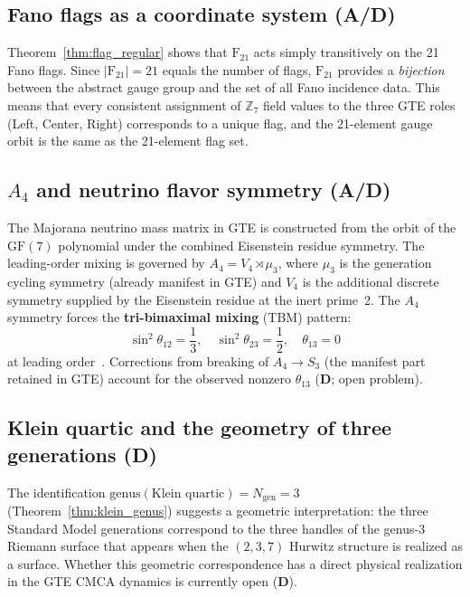 \documentclass[11pt]{article}
\theoremstyle{remark}
\newcommand{\GF}[1]{\ensuremath{\mathrm{GF}(#1)}}
\newcommand{\Ngen}{\ensuremath{N_{\mathrm{gen}}}}
\newcommand{\FineSeven}{\ensuremath{\mathrm{F}_{21}}}
\newcommand{\AltFour}{\ensuremath{A_4}}
\newcommand{\KleinFour}{\ensuremath{V_4}}
\newcommand{\CatAD}{\textbf{A/D}}
\newcommand{\CatD}{\textbf{D}}
\begin{document}
\subsection{Fano flags as a coordinate system (\CatAD)}

Theorem~\ref{thm:flag_regular} shows that $\FineSeven$ acts simply transitively
on the 21 Fano flags.
Since $|\FineSeven| = 21$ equals the number of flags, $\FineSeven$ provides a
\emph{bijection} between the abstract gauge group and the set of all Fano
incidence data.
This means that every consistent assignment of $\mathbb{Z}_7$ field values to
the three GTE roles (Left, Center, Right) corresponds to a unique flag, and the
21-element gauge orbit is the same as the 21-element flag set.

\subsection{\texorpdfstring{$\AltFour$}{A4} and neutrino flavor symmetry (\CatAD)}

The Majorana neutrino mass matrix in GTE is constructed from the orbit of the
$\GF{7}$ polynomial under the combined Eisenstein residue symmetry.
The leading-order mixing is governed by $\AltFour = \KleinFour \rtimes \mu_3$,
where $\mu_3$ is the generation cycling symmetry (already manifest in GTE) and
$\KleinFour$ is the additional discrete symmetry supplied by the Eisenstein
residue at the inert prime~2.
The $\AltFour$ symmetry forces the \textbf{tri-bimaximal mixing} (TBM) pattern:
\begin{equation}
  \sin^2\theta_{12} = \frac{1}{3}, \quad
  \sin^2\theta_{23} = \frac{1}{2}, \quad
  \theta_{13} = 0
\end{equation}
at leading order~\cite{SpivackGTECompleteFramework}.
Corrections from breaking of $\AltFour \to S_3$ (the manifest part retained
in GTE) account for the observed nonzero $\theta_{13}$ (\CatD; open problem).

\subsection{Klein quartic and the geometry of three generations (\CatD)}

The identification $\mathrm{genus}(\text{Klein quartic}) = \Ngen = 3$
(Theorem~\ref{thm:klein_genus}) suggests a geometric interpretation: the three
Standard Model generations correspond to the three handles of the genus-3
Riemann surface that appears when the $(2,3,7)$ Hurwitz structure is realized
as a surface.
Whether this geometric correspondence has a direct physical realization in the
GTE CMCA dynamics is currently open (\CatD).
\end{document}
